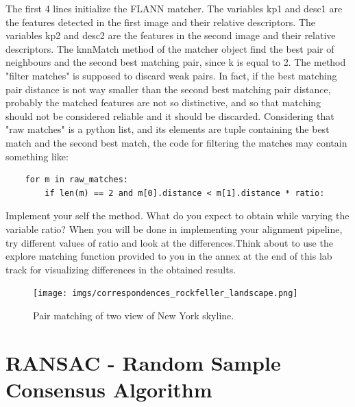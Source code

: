 \documentclass[aps,letterpaper,10pt]{revtex4}
\begin{document}
\vspace{3mm}
The first 4 lines initialize the FLANN matcher. The variables kp1 and desc1 are the features detected in the first image and their relative descriptors. The variables kp2 and desc2 are the features in the second image and their relative descriptors. The knnMatch method of the matcher object find the best pair of neighbours and the second best matching pair, since k is equal to 2. The method "filter matches" is supposed to discard weak pairs. In fact, if the best matching pair distance is not way smaller than the second best matching pair distance, probably the matched features are not so distinctive, and so that matching should not be considered reliable and it should be discarded. Considering that "raw matches" is a python list, and its elements are tuple containing the best match and the second best match, the code for filtering the matches may contain something like:
\begin{lstlisting}
    for m in raw_matches:
        if len(m) == 2 and m[0].distance < m[1].distance * ratio:
\end{lstlisting}
Implement your self the method. What do you expect to obtain while varying the variable ratio? When you will be done in implementing your alignment pipeline, try different values of ratio and look at the differences.Think about to use the explore matching function provided to you in the annex at the end of this lab track for visualizing differences in the obtained results.

\begin{figure}[h]
	\begin{center}
		\texttt{[image: imgs/correspondences\_rockfeller\_landscape.png]}
	\end{center}
\caption{Pair matching of two view of New York skyline.}
\end{figure}

\section{RANSAC - Random Sample Consensus Algorithm}
\end{document}
